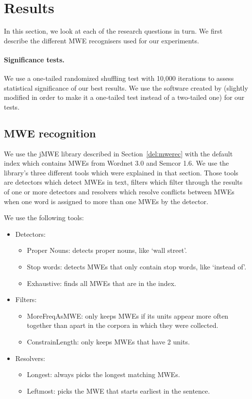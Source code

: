 \documentclass[output=paper]{langsci/langscibook}
\begin{document}
\section{Results}
\label{del:exp}

In this section, we look at each of the research questions in turn. We first describe the different MWE recognisers used for our experiments.
\paragraph*{Significance tests.}
We use a one-tailed randomized shuffling test with 10,000 iterations to assess statistical significance of our best results. We use the software created by \citet{sigf06} (slightly modified in order to make it a one-tailed test instead of a two-tailed one) for our tests.

\subsection{MWE recognition}
\label{del:expmwerec}
\indent We use the jMWE library described in Section~\ref{del:mwerec} with the default index which contains MWEs from Wordnet 3.0 and Semcor 1.6. We use the library's three different tools which were explained in that section. Those tools are detectors which detect MWEs in text, filters which filter through the results of one or more detectors and resolvers which resolve conflicts between MWEs when one word is assigned to more than one MWEs by the detector.

We use the following tools:
\begin{itemize}
    \item Detectors:
        \begin{itemize}
            \item Proper Nouns: detects proper nouns, like `wall street'.
            \item Stop words: detects MWEs that only contain stop words, like `instead of'.
            \item Exhaustive: finds all MWEs that are in the index.
        \end{itemize}
    \item Filters:
        \begin{itemize}
            \item MoreFreqAsMWE: only keeps MWEs if its units appear more often together than apart in the corpora in which they were collected.
            \item ConstrainLength: only keeps MWEs that have 2 units.
        \end{itemize}
    \item Resolvers:
        \begin{itemize}
            \item Longest: always picks the longest matching MWEs.
            \item Leftmost: picks the MWE that starts earliest in the sentence.
        \end{itemize}
\end{itemize}
\end{document}
